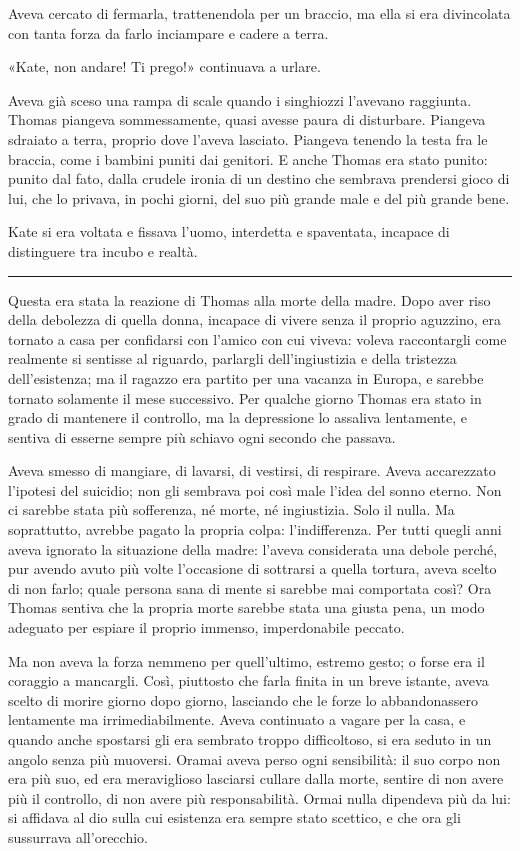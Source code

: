 Aveva cercato di fermarla, trattenendola per un braccio, ma ella si era divincolata con tanta forza
da farlo inciampare e cadere a terra.

«Kate, non andare! Ti prego!» continuava a urlare.

Aveva già sceso una rampa di scale quando i singhiozzi l'avevano raggiunta. Thomas piangeva
sommessamente, quasi avesse paura di disturbare. Piangeva sdraiato a terra, proprio dove l'aveva
lasciato. Piangeva tenendo la testa fra le braccia, come i bambini puniti dai genitori. E anche
Thomas era stato punito: punito dal fato, dalla crudele ironia di un destino che sembrava prendersi
gioco di lui, che lo privava, in pochi giorni, del suo più grande male e del più grande bene.

Kate si era voltata e fissava l'uomo, interdetta e spaventata, incapace di distinguere tra incubo e
realtà.

\plainbreak{1}

Questa era stata la reazione di Thomas alla morte della madre. Dopo aver riso della debolezza di
quella donna, incapace di vivere senza il proprio aguzzino, era tornato a casa per confidarsi con
l'amico con cui viveva: voleva raccontargli come realmente si sentisse al riguardo, parlargli
dell'ingiustizia e della tristezza dell'esistenza; ma il ragazzo era partito per una vacanza in
Europa, e sarebbe tornato solamente il mese successivo. Per qualche giorno Thomas era stato in grado
di mantenere il controllo, ma la depressione lo assaliva lentamente, e sentiva di esserne sempre più
schiavo ogni secondo che passava.

Aveva smesso di mangiare, di lavarsi, di vestirsi, di respirare. Aveva accarezzato l'ipotesi del
suicidio; non gli sembrava poi così male l'idea del sonno eterno. Non ci sarebbe stata più
sofferenza, né morte, né ingiustizia. Solo il nulla. Ma soprattutto, avrebbe pagato la propria
colpa: l'indifferenza. Per tutti quegli anni aveva ignorato la situazione della madre: l'aveva
considerata una debole perché, pur avendo avuto più volte l'occasione di sottrarsi a quella tortura,
aveva scelto di non farlo; quale persona sana di mente si sarebbe mai comportata così? Ora Thomas
sentiva che la propria morte sarebbe stata una giusta pena, un modo adeguato per espiare il proprio
immenso, imperdonabile peccato.

Ma non aveva la forza nemmeno per quell'ultimo, estremo gesto; o forse era il coraggio a mancargli.
Così, piuttosto che farla finita in un breve istante, aveva scelto di morire giorno dopo giorno,
lasciando che le forze lo abbandonassero lentamente ma irrimediabilmente. Aveva continuato a vagare
per la casa, e quando anche spostarsi gli era sembrato troppo difficoltoso, si era seduto in un
angolo senza più muoversi. Oramai aveva perso ogni sensibilità: il suo corpo non era più suo, ed era
meraviglioso lasciarsi cullare dalla morte, sentire di non avere più il controllo, di non avere più
responsabilità. Ormai nulla dipendeva più da lui: si affidava al dio sulla cui esistenza era sempre
stato scettico, e che ora gli sussurrava all'orecchio.

